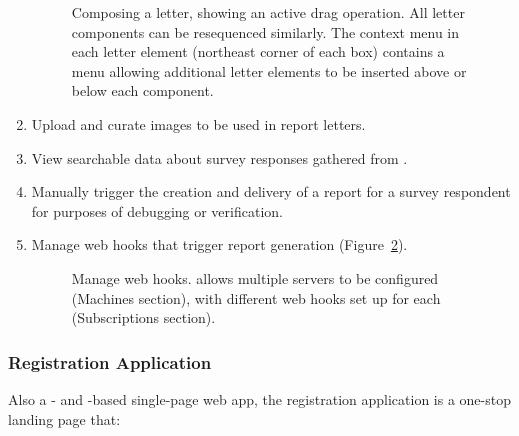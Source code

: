 \documentclass{article}
\begin{document}
\begin{enumerate}
  \begin{figure}
    \centering
    \caption{
      Composing a letter, showing an active drag operation.
      All letter components can be resequenced similarly.
      The context menu in each letter element (northeast corner of each box)
      contains a menu allowing additional letter elements to be inserted
      above or below each component.
    }
    \label{fig:compose-letter}
  \end{figure}
\item
  Upload and curate images to be used in report letters.
\item
  View searchable data about survey responses gathered from \qual.
\item
  Manually trigger the creation and delivery of a report for a survey respondent
  for purposes of debugging or verification.
\item
  Manage \qual{} web hooks that trigger report generation
  (Figure~\ref{fig:manage-web-hooks}).

  
  \begin{figure}
    \centering
    \caption{
      Manage \qual{} web hooks.
      \caper{} allows multiple servers to be configured (\textsf{Machines} section),
      with different web hooks set up for each (\textsf{Subscriptions} section).
    }
    \label{fig:manage-web-hooks}
  \end{figure}
\end{enumerate}

\subsubsection{Registration Application}
\label{sec:group-app}

Also a \vue{}- and \vuetify{}-based
single-page web app,
the \caper{} registration application
is a one-stop landing page that:
\end{document}
